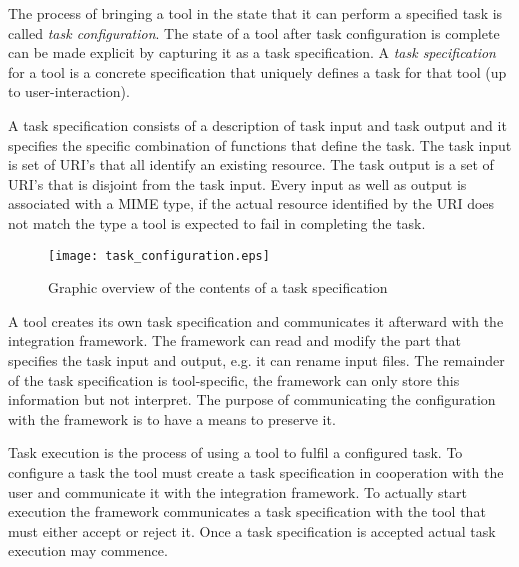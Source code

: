 \documentclass{article}
\begin{document}
   
   The process of bringing a tool in the state that it can perform a specified
   task is called \textit{task configuration}. The state of a tool after task
   configuration is complete can be made explicit by capturing it as a task
   specification.  A \textit{task specification} for a tool is a concrete
   specification that uniquely defines a task for that tool (up to
   user-interaction).

   \noindent A task specification consists of a description of task input and
   task output and it specifies the specific combination of functions that
   define the task. The task input is set of URI's that all identify an
   existing resource. The task output is a set of URI's that is disjoint from
   the task input. Every input as well as output is associated with a MIME
   type, if the actual resource identified by the URI does not match the type a
   tool is expected to fail in completing the task.

   \begin{figure}[H]
    \begin{center}
     \texttt{[image: task\_configuration.eps]}
    \end{center}
    \caption{Graphic overview of the contents of a task specification}
   \end{figure}

 
   A tool creates its own task specification and communicates it afterward
   with the integration framework. The framework can read and modify the part
   that specifies the task input and output, e.g. it can rename input files.
   The remainder of the task specification is tool-specific, the framework can
   only store this information but not interpret. The purpose of communicating
   the configuration with the framework is to have a means to preserve it.
   
   Task execution is the process of using a tool to fulfil a configured task.
   To configure a task the tool must create a task specification in cooperation
   with the user and communicate it with the integration framework. To actually
   start execution the framework communicates a task specification with the
   tool that must either accept or reject it. Once a task specification is
   accepted actual task execution may commence.
\end{document}
